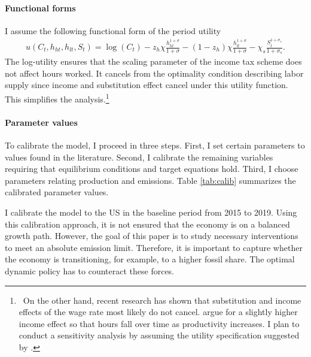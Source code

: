 \paragraph{Functional forms} I assume the following functional form of the period utility
\begin{align*}
u(C_t,h_{ht}, h_{lt}, S_t )= \log(C_t)-z_h\chi\frac{h_{ht}^{1+\sigma}}{{1+\sigma}}-(1-z_h)\chi\frac{h_{lt}^{1+\sigma}}{{1+\sigma}}-\chi_s\frac{S_t^{1+\sigma_s}}{1+\sigma_s}.
\end{align*}
The log-utility ensures that the scaling parameter of the income tax scheme does not affect hours worked. It cancels from the optimality condition describing labor supply since income and substitution effect cancel under this utility function. 
This simplifies the analysis.\footnote{\ On the other hand, recent research has shown that substitution and income effects of the wage rate most likely do not cancel. \cite{Boppart2019LaborPerspectiveb} argue for a slightly higher income effect so that hours fall over time as productivity increases. I plan to conduct a sensitivity analysis by assuming the utility specification suggested by \cite{Boppart2019LaborPerspectiveb}. 
}%

\paragraph{Parameter values}

To calibrate the model, I proceed in three steps. First, I set certain parameters to values found in the literature. Second, I calibrate the remaining variables requiring that equilibrium conditions and target equations hold. Third, I choose parameters relating production and emissions. Table \ref{tab:calib} summarizes the calibrated parameter values.

I calibrate the model to the US in the baseline period from 2015 to 2019. Using this calibration approach, it is not ensured that the economy is on a balanced growth path. However, the goal of this paper is to study necessary interventions to meet an absolute emission limit. Therefore, %
it is important to capture whether the economy is transitioning, for example, to %
a higher fossil share. The optimal dynamic policy has to counteract these forces. %


